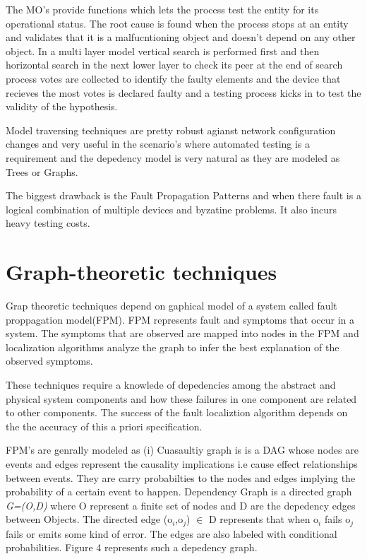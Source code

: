 \documentclass[10pt]{sigplan-proc-varsize}
\begin{document}
The MO's provide functions which lets the process test the entity for its operational status.  The root cause is found when the process stops at an entity and validates that it is a malfucntioning object and doesn't depend on any other object. In a multi layer model vertical search is performed first and then horizontal search in the next lower layer to check its peer at the end of search process votes are collected to identify the faulty elements and the device that recieves the most votes is declared faulty and a testing process kicks in to test the validity of the hypothesis. 

Model traversing techniques are pretty robust agianst network configuration changes and very useful in the scenario's where automated testing is a requirement and the depedency model is very natural as they are modeled as Trees or Graphs. 

The biggest drawback is the Fault Propagation Patterns and when there  fault is a logical combination of multiple devices and byzatine problems. It also incurs heavy testing costs. 

\section{Graph-theoretic techniques}
 
Grap theoretic techniques depend on gaphical model of a system called fault proppagation model(FPM). FPM represents fault and symptoms that occur in a system. 
The symptoms that are observed are mapped into nodes in the FPM and localization algorithms analyze the graph to infer the best explanation of the observed symptoms. 

These techniques require a knowlede of depedencies among the abstract and physical system components and how these failures in one component are related to 
other components. The success of the fault localiztion algorithm depends on the the accuracy of this a priori specification.

FPM's are genrally modeled as (i) Cuasaultiy graph is is a DAG whose nodes are events and edges represent the causality implications i.e cause effect relationships 
between events. They are carry probabilties to the nodes and edges implying the probability of a certain event to happen. 
Dependency Graph is a directed graph {\it{G=(O,D)}} where O represent a finite set of nodes and D are the depedency edges between Objects. 
The directed edge (o$_{i}$,o$_{j}$) $\in$ D represents that when o$_{i}$ fails o$_{j}$ fails or emits some kind of error. 
The edges are also labeled with conditional probabilities. Figure 4 represents such a depedency graph.
\end{document}

